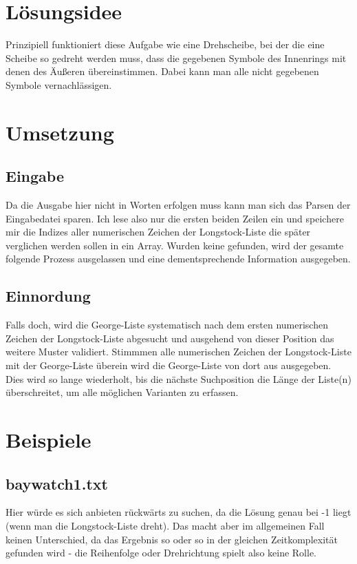 \documentclass[a4paper,10pt,ngerman]{scrartcl}
\title{\Aufgabe}
\author{\Name\\Team-ID: \TeamId}
\date{\today}
\begin{document}
\maketitle
\tableofcontents

\section{Lösungsidee}
Prinzipiell funktioniert diese Aufgabe wie eine Drehscheibe, bei der die eine Scheibe so gedreht werden muss, dass die gegebenen Symbole des Innenrings mit denen des Äußeren übereinstimmen. Dabei kann man alle nicht gegebenen Symbole vernachlässigen.

\section{Umsetzung}

\subsection{Eingabe}
Da die Ausgabe hier nicht in Worten erfolgen muss kann man sich das Parsen der Eingabedatei sparen. Ich lese also nur die ersten beiden Zeilen ein und speichere mir die Indizes aller numerischen Zeichen der Longstock-Liste die später verglichen werden sollen in ein Array. Wurden keine gefunden, wird der gesamte folgende Prozess ausgelassen und eine dementsprechende Information ausgegeben.

\subsection{Einnordung}
Falls doch, wird die George-Liste systematisch nach dem ersten numerischen Zeichen der Longstock-Liste abgesucht und ausgehend von dieser Position das weitere Muster validiert.
Stimmmen alle numerischen Zeichen der Longstock-Liste mit der George-Liste überein wird die George-Liste von dort aus ausgegeben. Dies wird so lange wiederholt, bis die nächste Suchposition die Länge der Liste(n) überschreitet, um alle möglichen Varianten zu erfassen.

\section{Beispiele}
\subsection{baywatch1.txt} Hier würde es sich anbieten rückwärts zu suchen, da die Lösung genau bei -1 liegt (wenn man die Longstock-Liste dreht). Das macht aber im allgemeinen Fall keinen Unterschied, da das Ergebnis so oder so in der gleichen Zeitkomplexität gefunden wird - die Reihenfolge oder Drehrichtung spielt also keine Rolle.
\end{document}

